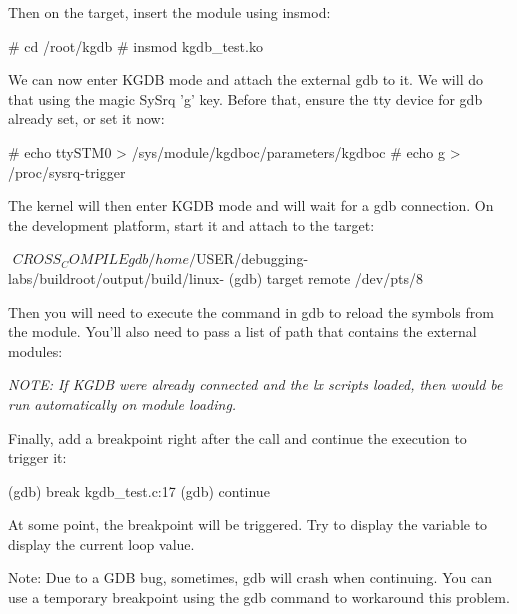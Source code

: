 Then on the target, insert the module using insmod:
\begin{bashinput}
# cd /root/kgdb
# insmod kgdb_test.ko
\end{bashinput}

We can now enter KGDB mode and attach the external gdb to it. We will do
that using the magic SySrq 'g' key. Before that, ensure the tty
device for gdb already set, or set it now:

\begin{bashinput}
# echo ttySTM0 > /sys/module/kgdboc/parameters/kgdboc
# echo g > /proc/sysrq-trigger
\end{bashinput}

The kernel will then enter KGDB mode and will wait for a gdb connection. On the
development platform, start it and attach to the target:

\begin{bashinput}$
$ ${CROSS_COMPILE}gdb /home/$USER/debugging-labs/buildroot/output/build/linux-%
(gdb) target remote /dev/pts/8
\end{bashinput}

Then you will need to execute the  command in gdb to reload the
symbols from the module. You'll also need to pass a list of path that contains
the external modules:


{\em NOTE: If KGDB were already connected and the lx scripts loaded, then
 would be run automatically on module loading.}

Finally, add a breakpoint right after the  call and continue
the execution to trigger it:

\begin{bashinput}
(gdb) break kgdb_test.c:17
(gdb) continue
\end{bashinput}

At some point, the breakpoint will be triggered. Try to display the variable
 to display the current loop value.

Note: Due to a GDB bug, sometimes, gdb will crash when continuing. You can
use a temporary breakpoint using the gdb  command to workaround
this problem.

